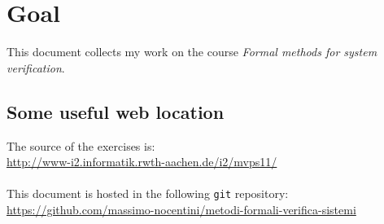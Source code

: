 \section*{Goal}
This document collects my work on the course \emph{Formal methods for
  system verification}.

\subsection*{Some useful web location}
The source of the exercises is:\\
\href{http://www-i2.informatik.rwth-aachen.de/i2/mvps11/}{
  http://www-i2.informatik.rwth-aachen.de/i2/mvps11/}
\\\\
This document is hosted in the following \texttt{git} repository:
\\
\href{https://github.com/massimo-nocentini/metodi-formali-verifica-sistemi}{
  https://github.com/massimo-nocentini/metodi-formali-verifica-sistemi}

